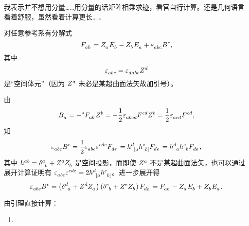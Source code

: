 \begin{xiti}
		\begin{zm}
			我表示并不想用分量……用分量的话矩阵相乘求迹，看官自行计算。还是几何语言看着舒服，虽然看着计算更长……
			\begin{Lemma}
				\label{lemma-6.15}
				对任意参考系有分解式
				\begin{equation*}
					\tensor{F}{_a_b} = \tensor{Z}{_a} \tensor{E}{_b} - \tensor{Z}{_b} \tensor{E}{_a} + \tensor{\varepsilon}{_a_b_c} \tensor{B}{^c},
				\end{equation*}
				其中
				\begin{equation*}
					\tensor{\varepsilon}{_a_b_c} = \tensor{\varepsilon}{_d_a_b_c} \tensor{Z}{^d}
				\end{equation*}
				是“空间体元”（因为 $\tensor{Z}{^a}$ 未必是某超曲面法矢故加引号）。
			\end{Lemma}
			\begin{Proof}
				由
				\begin{equation*}
					\tensor{B}{_a} = - \tensor[^*]{F}{_a_b} \tensor{Z}{^b} = - \frac{1}{2} \tensor{\varepsilon}{_a_b_c_d} \tensor{F}{^c^d} \tensor{Z}{^b} = \frac{1}{2} \tensor{\varepsilon}{_a_c_d} \tensor{F}{^c^d},
				\end{equation*}
				知
				\begin{equation*}
					\tensor{\varepsilon}{_a_b_c} \tensor{B}{^c} = \frac{1}{2} \tensor{\varepsilon}{_a_b_c} \tensor{\varepsilon}{^c^d^e} \tensor{F}{_d_e} = \tensor{h}{^{d}_{[a}} \tensor{h}{^{e}_{b]}} \tensor{F}{_d_e} = \tensor{h}{^{d}_a} \tensor{h}{^{e}_b} \tensor{F}{_d_e},
				\end{equation*}
				其中 $\tensor{h}{^a^b} = \tensor{\delta}{^a_b} + \tensor{Z}{^a} \tensor{Z}{_b}$ 是空间投影，而即使 $\tensor{Z}{^a}$ 不是某超曲面法矢，也可以通过展开计算证明有 $\tensor{\varepsilon}{_a_b_c} \tensor{\varepsilon}{^c^d^e} = 2\tensor{h}{^{d}_{[a}} \tensor{h}{^{e}_{b]}}$。进一步展开得
				\begin{equation*}
					\tensor{\varepsilon}{_a_b_c} \tensor{B}{^c} = \left( \tensor{\delta}{^d_a} + \tensor{Z}{^d} \tensor{Z}{_a} \right) \left( \tensor{\delta}{^e_b} + \tensor{Z}{^e} \tensor{Z}{_b} \right) \tensor{F}{_d_e} = \tensor{F}{_a_b} - \tensor{Z}{_a} \tensor{E}{_b} + \tensor{Z}{_b} \tensor{E}{_a}.
				\end{equation*}
			\end{Proof}
			由引理直接计算：
			\begin{enumerate}[label=(\alph*)]
				\item 
				\begin{equation*}
					\begin{split}

\end{split}
\end{equation*}
\end{enumerate}
\end{zm}
\end{xiti}

